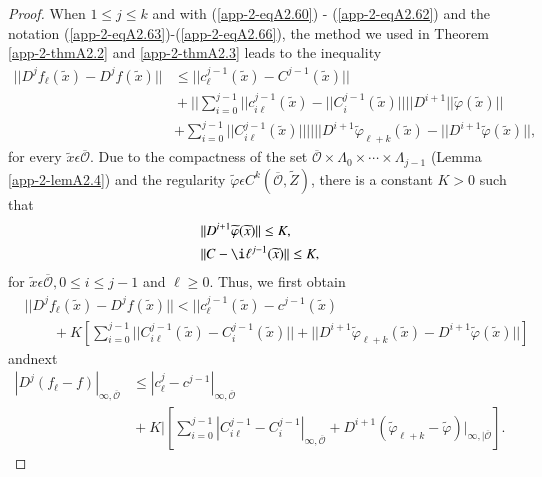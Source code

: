 \begin{proof}
When $1 \leq j \leq k$ and with (\ref{app-2-eqA2.60}) - (\ref{app-2-eqA2.62}) and the notation
(\ref{app-2-eqA2.63})-(\ref{app-2-eqA2.66}), the method we used in Theorem \ref{app-2-thmA2.2} and \ref{app-2-thmA2.3} leads to
the inequality
\begin{align*}
||D^{j}f_{\ell}(\widetilde{x}) - D^{j}f(\widetilde{x})|| &\leq
||c_{\ell}^{j-1} (\widetilde{x}) -C^{j-1}(\widetilde{x})||\\ 
&{}+||\sum\limits_{i=0}^{j-1} ||c_{i\ell}^{j-1} (\widetilde{x}) -
||C_{i}^{j-1}(\widetilde{x})|| ||D^{i+1}
||\widetilde{\varphi}(\widetilde{x})|| \\
& + \sum\limits_{i=0}^{j-1} ||C_{i\ell}^{j-1} (\widetilde{x})||
||||D^{i+1}\widetilde{\varphi}_{\ell + k}(\widetilde{x}) -
||D^{i+1}\widetilde{\varphi}(\widetilde{x})||, 
\end{align*}
for every $\widetilde{x} \epsilon \overline{\mathscr{O}}$. Due to the
compactness of the set $\overline{\mathscr{O}} \times \Lambda_{0}
\times \cdots \times \Lambda_{j-1}$ (Lemma \ref{app-2-lemA2.4}) and the regularity
$\widetilde{\varphi} \epsilon C^{k}(\overline{\mathscr{O}},
\widetilde{Z})$, there is a constant $K > 0$ such that
\begin{align*}
& ||D^{i+1} \widetilde{\varphi}(\widetilde{x})|| \leq K,\\
& ||C-{\i\ell}^{j-1} (\widetilde{x})|| \leq K,
\end{align*}
for $\widetilde{x} \epsilon \overline{\mathscr{O}}, 0 \leq i \leq j-1$
and $\ell \geq 0$. Thus, we first obtain
\begin{align*}
&||D^{j}f_{\ell}(\widetilde{x}) - D^{j}f(\widetilde{x})|| <
||c_{\ell}^{j-1} (\widetilde{x})-c^{j-1}(\widetilde{x})\\ 
&\qquad{}+ K\left[\sum\limits_{i=0}^{j-1} ||C_{i\ell}^{j-1} (\widetilde{x}) -
  C_{i}^{j-1}(\widetilde{x})|| + ||D^{i+1} \widetilde{\varphi}_{\ell +
k}(\widetilde{x}) - D^{i + 1} \widetilde{\varphi}(\widetilde{x})||\right]
\end{align*}
and\pageoriginale next
\begin{align*}
|D^{j}(f_{\ell} - f)|_{\infty, \overline{\mathscr{O}}} &\leq
|c_{\ell}^{j} - c^{j-1}|_{\infty, \overline{\mathscr{O}}}\\ 
&{}+ K|\left[\sum\limits_{i=0}^{j-1} |C_{i\ell}^{j-1} -
 C_{i}^{j-1}|_{\infty, \overline{\mathscr{O}}} + D^{i+1}
(\widetilde{\varphi}_{\ell + k} - \widetilde{\varphi})|_{\infty,
|\overline{\mathscr{O}}}\right].\tag{A2.67} \label{app-2-eqA2.67}
\end{align*}


\end{proof}
